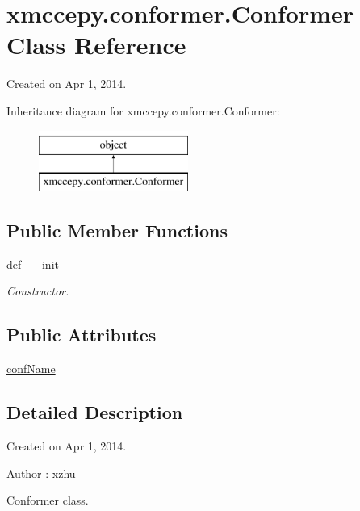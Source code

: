 \hypertarget{classxmccepy_1_1conformer_1_1_conformer}{\section{xmccepy.\-conformer.\-Conformer Class Reference}
\label{classxmccepy_1_1conformer_1_1_conformer}
}


Created on Apr 1, 2014.  


Inheritance diagram for xmccepy.\-conformer.\-Conformer\-:\begin{figure}[H]
\begin{center}
\leavevmode
\includegraphics[height=2.000000cm]{classxmccepy_1_1conformer_1_1_conformer}
\end{center}
\end{figure}
\subsection*{Public Member Functions}
\begin{DoxyCompactItemize}
\item 
def \hyperlink{classxmccepy_1_1conformer_1_1_conformer_ace05398b4ffadf035bc7250d7da98c31}{\-\_\-\-\_\-init\-\_\-\-\_\-}
\begin{DoxyCompactList}\small\item\em Constructor. \end{DoxyCompactList}\end{DoxyCompactItemize}
\subsection*{Public Attributes}
\begin{DoxyCompactItemize}
\item 
\hyperlink{classxmccepy_1_1conformer_1_1_conformer_a717881e47510ed18cda5d11489122c5a}{conf\-Name}
\end{DoxyCompactItemize}


\subsection{Detailed Description}
Created on Apr 1, 2014. 

\begin{DoxyAuthor}{Author}
\-: xzhu \begin{DoxyVerb}Conformer class.\end{DoxyVerb}
 
\end{DoxyAuthor}


